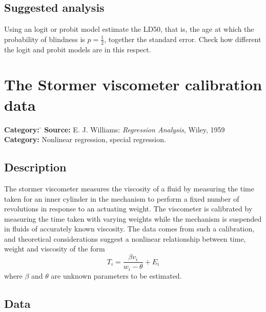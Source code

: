 \documentclass{article}
\begin{document}
\subsection*{Suggested analysis}
Using an logit or probit model estimate the LD50, that is, the age at which
the probability of blindness is $p=\frac{1}{2}$, together the standard
error.  Check how different the logit and probit models are in this respect.

\clearpage\section{The Stormer viscometer calibration data}
\begin{tabbing}
\textbf{Category:} \= \kill
\textbf{Source:} \> E. J. Williams: \textsl{Regression Analysis}, Wiley, 1959\\
\textbf{Category:} \> Nonlinear regression, special regression.
\end{tabbing}

\subsection*{Description}
The stormer viscometer measures the viscosity of a fluid by measuring the
time taken for an inner cylinder in the mechanism to perform a fixed number
of revolutions in response to an actuating weight.  The viscometer is
calibrated by measuring the time taken with varying weights while the
mechanism is suspended in fluids of accurately known viscosity.  The data
comes from such a calibration, and theoretical considerations suggest a
nonlinear relationship between time, weight and viscosity of the form
\[
T_i = \frac{\beta v_i}{w_i - \theta} + E_i
\]
where $\beta$ and $\theta$ are unknown parameters to be estimated.


\subsection*{Data}
\end{document}
